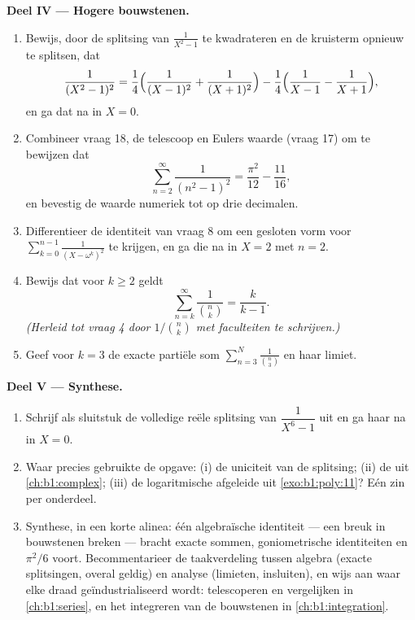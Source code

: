 \begin{problem}
\medskip
\noindent\textbf{Deel IV --- Hogere bouwstenen.}
\begin{enumerate}[resume]
  \item Bewijs, door de splitsing van $\frac1{X^2-1}$ te kwadrateren en
        de kruisterm opnieuw te splitsen, dat
        \[
        \frac1{(X^2-1)^2}
        = \frac14\Bigl(\frac1{(X-1)^2} + \frac1{(X+1)^2}\Bigr)
        - \frac14\Bigl(\frac1{X-1} - \frac1{X+1}\Bigr),
        \]
        en ga dat na in $X = 0$.
  \item Combineer vraag 18, de telescoop en Eulers waarde (vraag 17) om
        te bewijzen dat
        \[
        \sum_{n=2}^{\infty}\frac1{(n^2-1)^2}
        = \frac{\pi^2}{12} - \frac{11}{16} ,
        \]
        en bevestig de waarde numeriek tot op drie decimalen.
  \item Differentieer de identiteit van vraag 8 om een gesloten vorm
        voor $\sum_{k=0}^{n-1}\frac1{(X - \omega^k)^2}$ te krijgen, en
        ga die na in $X = 2$ met $n = 2$.
  \item Bewijs dat voor $k \geq 2$ geldt
        \[
        \sum_{n=k}^{\infty}\frac{1}{\binom nk} = \frac{k}{k-1} .
        \]
        \emph{(Herleid tot vraag 4 door $1/\binom nk$ met faculteiten te
        schrijven.)}
  \item Geef voor $k = 3$ de exacte partiële som
        $\sum_{n=3}^{N}\frac1{\binom n3}$ en haar limiet.
\end{enumerate}

\medskip
\noindent\textbf{Deel V --- Synthese.}
\begin{enumerate}[resume]
  \item Schrijf als sluitstuk de volledige reële splitsing van
        $\dfrac1{X^6 - 1}$ uit en ga haar na in $X = 0$.
  \item Waar precies gebruikte de opgave: (i) de uniciteit van de
        splitsing; (ii) de  uit \cref{ch:b1:complex};
        (iii) de logaritmische afgeleide uit \cref{exo:b1:poly:11}? Eén
        zin per onderdeel.
  \item Synthese, in een korte alinea: één algebraïsche identiteit ---
        een breuk in bouwstenen breken --- bracht exacte sommen,
        goniometrische identiteiten en $\pi^2/6$ voort. Becommentarieer
        de taakverdeling tussen algebra (exacte splitsingen, overal
        geldig) en analyse (limieten, insluiten), en wijs aan waar elke
        draad geïndustrialiseerd wordt: telescoperen en vergelijken in
        \cref{ch:b1:series}, en het integreren van de bouwstenen in
        \cref{ch:b1:integration}.
\end{enumerate}
\end{problem}
